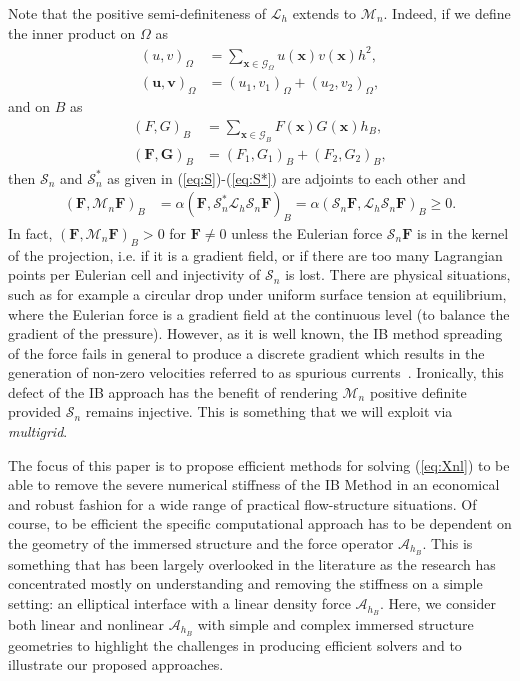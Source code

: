 \documentclass[preprint,12pt]{elsarticle}
\begin{document}
Note that  the positive semi-definiteness of $\mathcal{L}_h$ extends to $\mathcal{M}_n$. Indeed, if we define the inner product on $\Omega$ as
\begin{align}
(u,v)_{\Omega} &= \sum_{\mathbf{x} \in \mathcal{G}_\Omega} u(\mathbf{x})v(\mathbf{x})h^2,\label{eq:innero} \\
(\mathbf{u},\mathbf{v})_{\Omega} &=  (u_1,v_1)_{\Omega} + (u_2,v_2)_{\Omega},
\end{align}
and on $B$ as
\begin{align}
(F,G)_{B} &= \sum_{\mathbf{x} \in \mathcal{G}_B} F(\mathbf{x})G(\mathbf{x})h_B,\label{eq:innerb} \\
(\mathbf{F},\mathbf{G})_{B} &= (F_1,G_1)_{B} + (F_2,G_2)_{B},
\end{align}
then  $\mathcal{S}_n$ and $\mathcal{S}_n^*$ as given in (\ref{eq:S})-(\ref{eq:S*}) are adjoints to each other 
and
\begin{align}
( \mathbf{F}, \mathcal{M}_n\mathbf{F} )_{B} &= \alpha ( \mathbf{F},\mathcal{S}^*_n\mathcal{L}_h\mathcal{S}_n \mathbf{F})_{B} =\alpha ( \mathcal{S}_n\mathbf{F}, \mathcal{L}_h\mathcal{S}_n\mathbf{F})_{B}\geq 0.
\end{align}
In fact, $( \mathbf{F}, \mathcal{M}_n\mathbf{F} )_{B}>0$ for $\mathbf{F} \neq 0$ unless the Eulerian force $\mathcal{S}_n \mathbf{F}$ is in the kernel of the projection, i.e. if it is a gradient field,  or if there are too many Lagrangian points per Eulerian cell and injectivity of $\mathcal{S}_n$ is lost. There are physical situations, such as for example a circular drop under uniform surface tension at equilibrium, where the Eulerian force is a gradient field at the continuous level (to balance the gradient of the pressure). However, as it is well 
known, the IB method spreading of the force fails in general to produce a discrete gradient which results in the generation of non-zero velocities referred to as spurious currents~\cite{Tryg01}.  Ironically, this defect of the IB approach has the benefit of rendering  $ \mathcal{M}_n$ positive definite provided $\mathcal{S}_n$ remains injective. This is something that we will exploit via {\em multigrid}.


The focus of this paper is to propose efficient methods for solving (\ref{eq:Xnl}) to be able to remove the severe numerical stiffness of the IB Method in an economical and robust fashion for a wide range of practical flow-structure situations.  Of course, to be efficient the specific computational approach  has to be dependent on the geometry of the immersed structure and the force operator $\mathcal{A}_{h_B}$.  This is something that has been largely 
overlooked in the literature as the research has concentrated mostly on understanding  and removing the stiffness 
on a simple setting: an elliptical interface with a linear density force $\mathcal{A}_{h_B}$.
Here, we consider both linear and nonlinear $\mathcal{A}_{h_B}$ with simple and complex immersed structure geometries to highlight the challenges in producing efficient solvers and to illustrate our proposed approaches.
\end{document}
